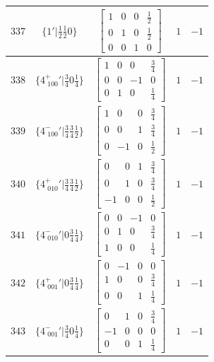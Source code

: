 \documentclass[fleqn,8pt]{jsarticle}
\begin{document}
\begin{longtable}{ccccc}
$ 337 $ & $ \{1{}'|\frac{1}{2} \frac{1}{2} 0\} $ & $ \begin{bmatrix} 1 & 0 & 0 & \frac{1}{2} \\ 0 & 1 & 0 & \frac{1}{2} \\ 0 & 0 & 1 & 0 \end{bmatrix} $ & $ 1 $ & $ -1 $ \\ \hline
$ 338 $ & $ \{4^{+}_{\,\,100}{}'|\frac{3}{4} 0 \frac{1}{4}\} $ & $ \begin{bmatrix} 1 & 0 & 0 & \frac{3}{4} \\ 0 & 0 & -1 & 0 \\ 0 & 1 & 0 & \frac{1}{4} \end{bmatrix} $ & $ 1 $ & $ -1 $ \\ \hline
$ 339 $ & $ \{4^{-}_{\,\,100}{}'|\frac{3}{4} \frac{3}{4} \frac{1}{2}\} $ & $ \begin{bmatrix} 1 & 0 & 0 & \frac{3}{4} \\ 0 & 0 & 1 & \frac{3}{4} \\ 0 & -1 & 0 & \frac{1}{2} \end{bmatrix} $ & $ 1 $ & $ -1 $ \\ \hline
$ 340 $ & $ \{4^{+}_{\,\,010}{}'|\frac{3}{4} \frac{3}{4} \frac{1}{2}\} $ & $ \begin{bmatrix} 0 & 0 & 1 & \frac{3}{4} \\ 0 & 1 & 0 & \frac{3}{4} \\ -1 & 0 & 0 & \frac{1}{2} \end{bmatrix} $ & $ 1 $ & $ -1 $ \\ \hline
$ 341 $ & $ \{4^{-}_{\,\,010}{}'|0 \frac{3}{4} \frac{1}{4}\} $ & $ \begin{bmatrix} 0 & 0 & -1 & 0 \\ 0 & 1 & 0 & \frac{3}{4} \\ 1 & 0 & 0 & \frac{1}{4} \end{bmatrix} $ & $ 1 $ & $ -1 $ \\ \hline
$ 342 $ & $ \{4^{+}_{\,\,001}{}'|0 \frac{3}{4} \frac{1}{4}\} $ & $ \begin{bmatrix} 0 & -1 & 0 & 0 \\ 1 & 0 & 0 & \frac{3}{4} \\ 0 & 0 & 1 & \frac{1}{4} \end{bmatrix} $ & $ 1 $ & $ -1 $ \\ \hline
$ 343 $ & $ \{4^{-}_{\,\,001}{}'|\frac{3}{4} 0 \frac{1}{4}\} $ & $ \begin{bmatrix} 0 & 1 & 0 & \frac{3}{4} \\ -1 & 0 & 0 & 0 \\ 0 & 0 & 1 & \frac{1}{4} \end{bmatrix} $ & $ 1 $ & $ -1 $ \\ \hline

\end{longtable}
\end{document}
